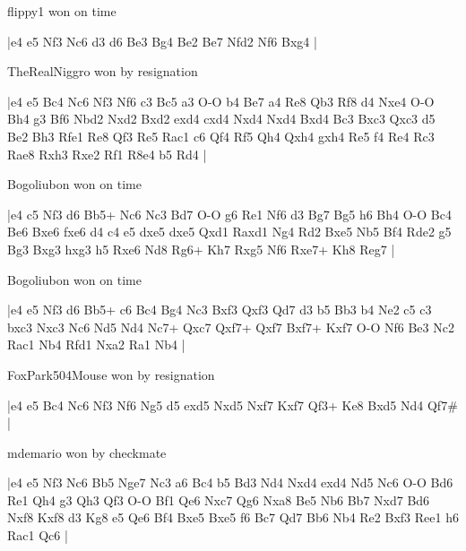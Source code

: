 \showboard

flippy1 won on time

\makegametitle
|e4 e5 Nf3 Nc6 d3 d6 Be3 Bg4 Be2 Be7 Nfd2 Nf6 Bxg4  |

\showboard

TheRealNiggro won by resignation

\makegametitle
|e4 e5 Bc4 Nc6 Nf3 Nf6 c3 Bc5 a3 O-O b4 Be7 a4 Re8 Qb3 Rf8 d4 Nxe4 O-O Bh4 g3 Bf6 Nbd2 Nxd2 Bxd2 exd4 cxd4 Nxd4 Nxd4 Bxd4 Bc3 Bxc3 Qxc3 d5 Be2 Bh3 Rfe1 Re8 Qf3 Re5 Rac1 c6 Qf4 Rf5 Qh4 Qxh4 gxh4 Re5 f4 Re4 Rc3 Rae8 Rxh3 Rxe2 Rf1 R8e4 b5 Rd4  |

\showboard

Bogoliubon won on time

\makegametitle
|e4 c5 Nf3 d6 Bb5+ Nc6 Nc3 Bd7 O-O g6 Re1 Nf6 d3 Bg7 Bg5 h6 Bh4 O-O Bc4 Be6 Bxe6 fxe6 d4 c4 e5 dxe5 dxe5 Qxd1 Raxd1 Ng4 Rd2 Bxe5 Nb5 Bf4 Rde2 g5 Bg3 Bxg3 hxg3 h5 Rxe6 Nd8 Rg6+ Kh7 Rxg5 Nf6 Rxe7+ Kh8 Reg7  |

\showboard

Bogoliubon won on time

\makegametitle
|e4 e5 Nf3 d6 Bb5+ c6 Bc4 Bg4 Nc3 Bxf3 Qxf3 Qd7 d3 b5 Bb3 b4 Ne2 c5 c3 bxc3 Nxc3 Nc6 Nd5 Nd4 Nc7+ Qxc7 Qxf7+ Qxf7 Bxf7+ Kxf7 O-O Nf6 Be3 Nc2 Rac1 Nb4 Rfd1 Nxa2 Ra1 Nb4  |

\showboard

FoxPark504Mouse won by resignation

\makegametitle
|e4 e5 Bc4 Nc6 Nf3 Nf6 Ng5 d5 exd5 Nxd5 Nxf7 Kxf7 Qf3+ Ke8 Bxd5 Nd4 Qf7\#  |

\showboard

mdemario won by checkmate

\makegametitle
|e4 e5 Nf3 Nc6 Bb5 Nge7 Nc3 a6 Bc4 b5 Bd3 Nd4 Nxd4 exd4 Nd5 Nc6 O-O Bd6 Re1 Qh4 g3 Qh3 Qf3 O-O Bf1 Qe6 Nxc7 Qg6 Nxa8 Be5 Nb6 Bb7 Nxd7 Bd6 Nxf8 Kxf8 d3 Kg8 e5 Qe6 Bf4 Bxe5 Bxe5 f6 Bc7 Qd7 Bb6 Nb4 Re2 Bxf3 Ree1 h6 Rac1 Qc6  |

\showboard


